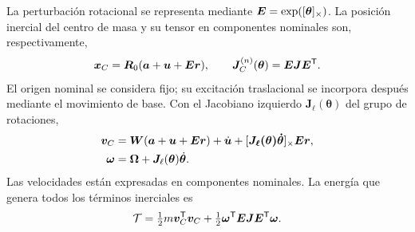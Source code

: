La perturbación rotacional se representa mediante $\bm E=\exp([\bm{\theta}]_\times)$. La posición inercial del centro de masa y su tensor en componentes nominales son, respectivamente,
\begin{equation}
\bm x_C=\bm R_0(\bm a+\bm u+\bm E\bm r),\qquad
\bm J_C^{(n)}(\bm\theta)=\bm E\bm J\bm E^\mathsf T.
\end{equation}
El origen nominal se considera fijo; su excitación traslacional se incorpora después mediante el movimiento de base. Con el Jacobiano izquierdo $\bm J_\ell(\bm\theta)$ del grupo de rotaciones,
\begin{align}
\bm v_C&=\bm W(\bm a+\bm u+\bm E\bm r)+\dot{\bm u}
+[\bm{J_\ell(\bm\theta)\dot{\bm\theta}}]_\times\bm E\bm r,\nonumber\\
\bm\omega&=\bm\Omega+\bm J_\ell(\bm\theta)\dot{\bm\theta}.
\label{apx:eq:exactvelocity}
\end{align}
Las velocidades están expresadas en componentes nominales. La energía que genera todos los términos inerciales es
\begin{equation}
\mathcal T=\tfrac12m\bm v_C^\mathsf T\bm v_C
+\tfrac12\bm\omega^\mathsf T\bm E\bm J\bm E^\mathsf T\bm\omega.
\label{apx:eq:exactT}
\end{equation}

